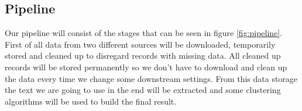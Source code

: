 \subsection{Pipeline}
\label{subsec:pipeline}

Our pipeline will consist of the stages that can be seen in figure \ref{fig:pipeline}. First of all data from two different sources will be downloaded, temporarily stored and cleaned up to disregard records with missing data.
All cleaned up records will be stored permanently so we don't have to download and clean up the data every time we change some downstream settings. From this data storage the text we are going to use in the end will be extracted and some clustering algorithms will be used to build the final result.
